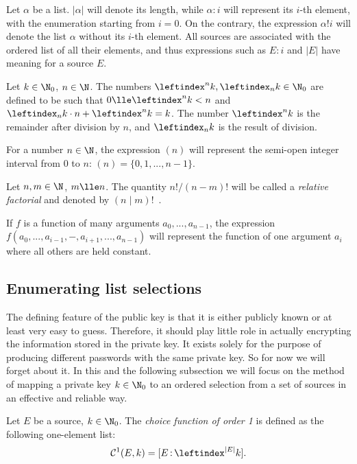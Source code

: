 \documentclass[12pt, a4paper]{article}
\newcommand{\C}{\mathcal{C}}
\newcommand{\lli}[1]{\leftindex_{#1}}
\newcommand{\lui}[1]{\leftindex^{#1}}
\newcommand{\elt}{\mathop{:}}
\newcommand{\wo}{\mathop{!}}
\begin{document}
Let $ \alpha $ be a list. $ |\alpha| $ will denote its length, while $ \alpha \elt i $ will represent its $ i $-th element, with the enumeration starting from $ i = 0 $. On the contrary, the expression $ \alpha \wo i $ will denote the list $ \alpha $ without its $ i $-th element. All sources are associated with the ordered list of all their elements, and thus expressions such as $ E \elt i $ and $ |E| $ have meaning for a source $ E $.


Let $ k \in \N_0 $, $ n \in \N $. The numbers $ \lui{n}k, \lli{n}k \in \N_0 $ are defined to be such that $ 0 \lle \lui{n}k < n $ and $ \lli{n}k \cdot n + \lui{n}k = k $. The number $ \lui{n}k $ is the remainder after division by $ n $, and $ \lli{n}k $ is the result of division.

For a number $ n \in \N $, the expression $ (n) $ will represent the semi-open integer interval from 0 to $ n $: $ (n) = \{0, 1, ..., n-1\} $.

Let $ n, m \in \N $, $ m \lle n $. The quantity $ n!/(n-m)! $ will be called a \emph{relative factorial} and denoted by $ (n \mid m)! $\ .

If $ f $ is a function of many arguments $ a_0, ..., a_{n-1} $, the expression $ f(a_0, ..., a_{i-1}, -, a_{i+1}, ..., a_{n-1}) $ will represent the function of one argument $ a_i $ where all others are held constant.

\subsection{Enumerating list selections}

The defining feature of the public key is that it is either publicly known or at least very easy to guess. Therefore, it should play little role in actually encrypting the information stored in the private key. It exists solely for the purpose of producing different passwords with the same private key. So for now we will forget about it. In this and the following subsection we will focus on the method of mapping a private key $ k \in \N_0 $ to an ordered selection from a set of sources in an effective and reliable way.

\begin{definition}
    Let $ E $ be a source, $ k \in \N_0 $. The \emph{choice function of order 1} is defined as the following one-element list:
    \[ \C^1(E, k) = [E \elt \lui{|E|}k]. \]
\end{definition}
\end{document}
